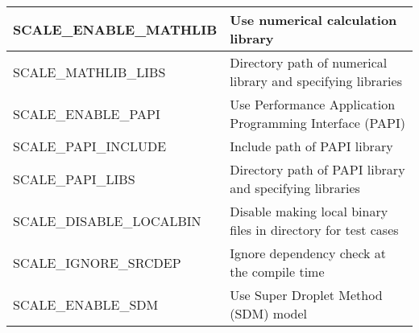 \begin{table}[htb]
\begin{center}
\begin{tabularx}{150mm}{|l|X|}
 SCALE\_ENABLE\_MATHLIB   & Use numerical calculation library \\ \hline
 SCALE\_MATHLIB\_LIBS     & Directory path of numerical library and specifying libraries \\ \hline
 SCALE\_ENABLE\_PAPI      & Use Performance Application Programming Interface (PAPI) \\ \hline
 SCALE\_PAPI\_INCLUDE     & Include path of PAPI library \\ \hline
 SCALE\_PAPI\_LIBS        & Directory path of PAPI library and specifying libraries \\ \hline
 SCALE\_DISABLE\_LOCALBIN & Disable making local binary files in directory for test cases \\ \hline
 SCALE\_IGNORE\_SRCDEP    & Ignore dependency check at the compile time \\ \hline
 SCALE\_ENABLE\_SDM       & Use Super Droplet Method (SDM) model \\ \hline
\end{tabularx}
\label{tab:env_var_list}
\end{center}
\end{table}

